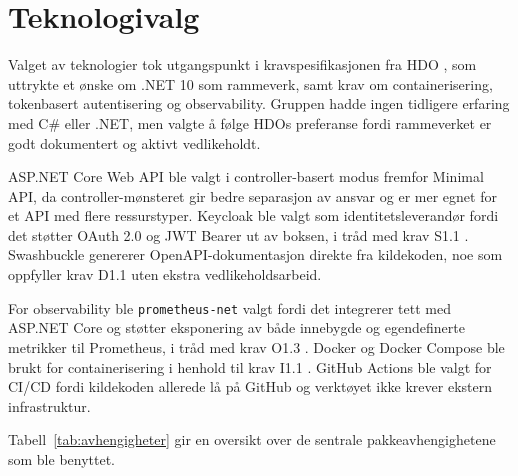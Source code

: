 \section{Teknologivalg}
\label{sec:teknologivalg}

Valget av teknologier tok utgangspunkt i kravspesifikasjonen fra HDO
\cite{hdo_kravspec}, som uttrykte et ønske om .NET 10 som rammeverk, samt
krav om containerisering, tokenbasert autentisering og observability.
Gruppen hadde ingen tidligere erfaring med C\# eller .NET, men valgte å
følge HDOs preferanse fordi rammeverket er godt dokumentert og aktivt
vedlikeholdt.

ASP.NET Core Web API ble valgt i controller-basert modus fremfor Minimal
API, da controller-mønsteret gir bedre separasjon av ansvar og er mer
egnet for et API med flere ressurstyper. Keycloak ble valgt som
identitetsleverandør fordi det støtter OAuth 2.0 og JWT Bearer ut av
boksen, i tråd med krav S1.1 \cite{hdo_kravspec}. Swashbuckle genererer
OpenAPI-dokumentasjon direkte fra kildekoden, noe som oppfyller krav D1.1
\cite{hdo_kravspec} uten ekstra vedlikeholdsarbeid.

For observability ble \texttt{prometheus-net} valgt fordi det integrerer
tett med ASP.NET Core og støtter eksponering av både innebygde og
egendefinerte metrikker til Prometheus, i tråd med krav O1.3
\cite{hdo_kravspec}. Docker og Docker Compose ble brukt for
containerisering i henhold til krav I1.1 \cite{hdo_kravspec}. GitHub
Actions ble valgt for CI/CD fordi kildekoden allerede lå på GitHub og
verktøyet ikke krever ekstern infrastruktur.

Tabell~\ref{tab:avhengigheter} gir en oversikt over de sentrale
pakkeavhengighetene som ble benyttet.

